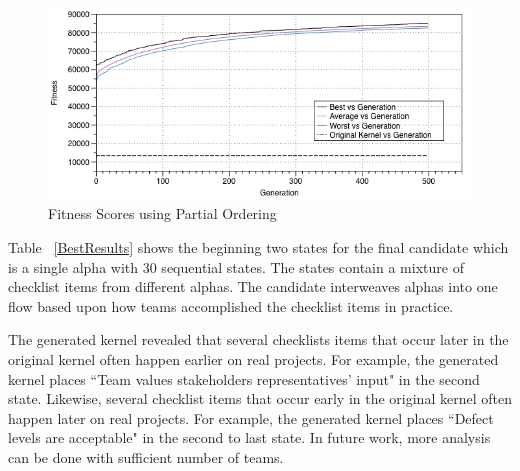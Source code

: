 \documentclass[preprint,12pt,3p]{elsarticle}
\begin{document}
\begin{figure}[ht]
\includegraphics[width=6.25in]{images/best_results_partial_ordering_500gens_40runs}
\caption{Fitness Scores using Partial Ordering}
\label{BestResultsPartialOrdering}
\end{figure}

Table ~\ref{BestResults} shows the beginning two states for the final candidate which is a single alpha with 30 sequential states. The states contain a mixture of checklist items from different alphas. The candidate interweaves alphas into one flow based upon how teams accomplished the checklist items in practice. 

The generated kernel revealed that several checklists items that occur later in the original kernel often happen earlier on real projects. For example, the generated kernel places ``Team values stakeholders representatives' input" in the second state. Likewise, several checklist items that occur early in the original kernel often happen later on real projects. For example, the generated kernel places ``Defect levels are acceptable" in the second to last state. In future work, more analysis can be done with sufficient number of teams.
\end{document}
